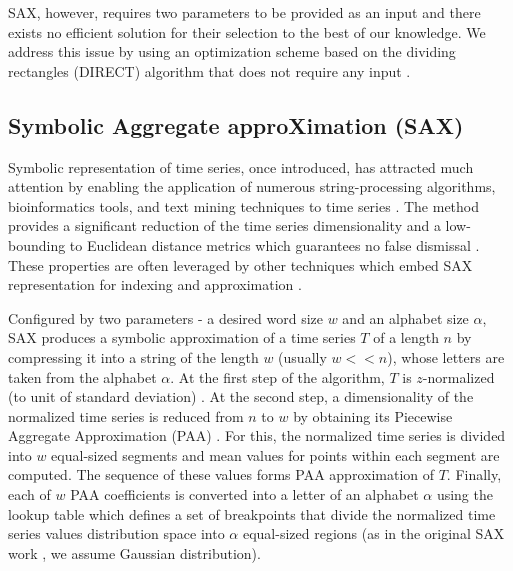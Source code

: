 \documentclass[conference]{IEEEtran}
\begin{document}
SAX, however, requires two parameters to be provided as an input and there exists 
no efficient solution for their selection to the best of our knowledge. 
We address this issue by using an optimization scheme based on the dividing 
rectangles (DIRECT) algorithm that does not require any input \cite{direct}. 

\subsection{Symbolic Aggregate approXimation (SAX)} \label{section-sax}
Symbolic representation of time series, once introduced, has attracted much attention by
enabling the application of numerous string-processing algorithms, bioinformatics tools, 
and text mining techniques to time series \cite{sax}. The method provides a significant 
reduction of the time series dimensionality and a low-bounding to Euclidean distance metrics
which guarantees no false dismissal \cite{exp_sax}.
These properties are often leveraged by other techniques which embed SAX representation 
for indexing and approximation \cite{fast-shapelets}.

Configured by two parameters - a desired word size $w$ and an alphabet size $\alpha$,
SAX produces a symbolic approximation of a time series $T$ of a length $n$ by compressing 
it into a string of the length $w$ (usually $w<<n$), whose letters are taken from 
the alphabet $\alpha$. 
At the first step of the algorithm, $T$ is $z$-normalized (to unit of standard deviation)
\cite{goldin_kanellakis}. 
At the second step, a dimensionality of the normalized time series is reduced from $n$ to $w$ by
obtaining its Piecewise Aggregate Approximation (PAA) \cite{paa}. 
For this, the normalized time series is divided into $w$ equal-sized segments 
and mean values for points within each segment are computed.
The sequence of these values forms PAA approximation of $T$. 
Finally, each of $w$ PAA coefficients is converted into a letter of an alphabet 
$\alpha$ using the lookup table which defines a set of breakpoints that divide 
the normalized time series values distribution space into $\alpha$ equal-sized regions
(as in the original SAX work \cite{sax}, we assume Gaussian distribution).
\end{document}
